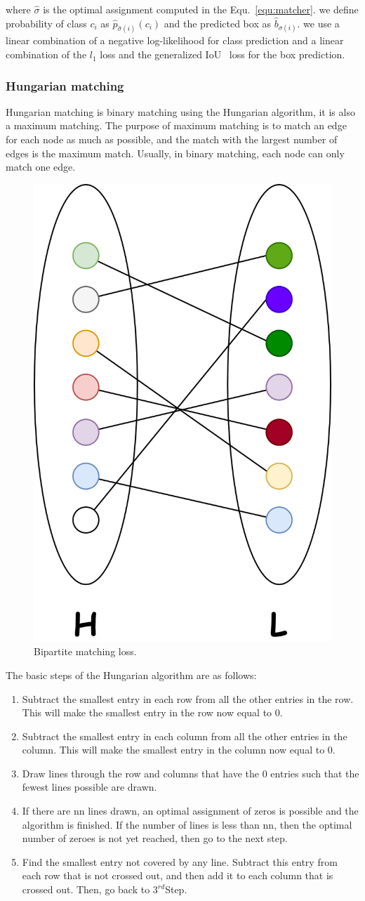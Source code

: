 where $ \hat{\sigma} $ is the optimal assignment computed in the Equ.~\ref{equ:matcher}. we define probability of class $ c_i $ as $ \hat{p}_{\hat{\sigma}(i)}(c_i)$ and the predicted box as $ \hat{b}_{\sigma(i)} $. we use a linear combination of a negative log-likelihood for class prediction and a linear combination of the $  l_1  $ loss and the generalized IoU~\cite{rezatofighi2019generalized} loss for the box prediction.

\subsubsection{Hungarian matching }

Hungarian matching is binary matching using the Hungarian algorithm, it is also a maximum matching. The purpose of maximum matching is to match an edge for each node as much as possible, and the match with the largest number of edges is the maximum match. Usually, in binary matching, each node can only match one edge.

\begin{figure}
	\centering
	\includegraphics[width=0.3\linewidth]{figures/matcher}
	\caption[Bipartite matching loss]{Bipartite matching loss.}
	\label{fig:matcher}
\end{figure}

The basic steps of the Hungarian algorithm are as follows:
\begin{enumerate}[1.]
	\item Subtract the smallest entry in each row from all the other entries in the row. This will make the smallest entry in the row now equal to 0.
	\item Subtract the smallest entry in each column from all the other entries in the column. This will make the smallest entry in the column now equal to 0.
	\item Draw lines through the row and columns that have the 0 entries such that the fewest lines possible are drawn.
	\item  If there are nn lines drawn, an optimal assignment of zeros is possible and the algorithm is finished. If the number of lines is less than nn, then the optimal number of zeroes is not yet reached, then go to the next step.
	\item Find the smallest entry not covered by any line. Subtract this entry from each row that is not  crossed out, and then add it to each column that is crossed out. Then, go back to $ 3^{rd} $Step.
\end{enumerate}




